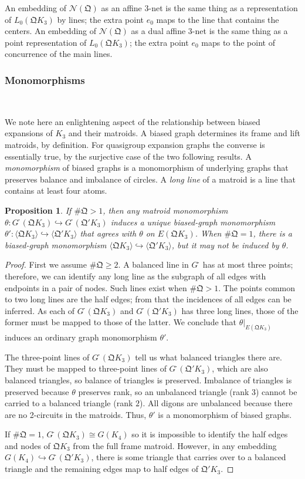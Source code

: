 \documentclass[reqno,12pt]{amsart}
\newtheorem{prop}[thm]{Proposition}
\theoremstyle{remark}
\numberwithin{equation}{section}
\numberwithin{figure}{section}
\newcommand\embeds{\hookrightarrow}
\newcommand \bgr[1]{\langle#1\rangle}
\newcommand \full{^{{}^{{}_{{}_\bullet}}\!}}
\newcommand \cN{\mathcal{N}}
\newcommand \fQ{\mathfrak Q}
\newcommand\G{{G\full}}
\begin{document}
An embedding of $\cN(\fQ)$ as an affine $3$-net is the same thing as a representation of $L_0(\fQ K_3)$ by lines; the extra point $e_0$ maps to the line that contains the centers.
An embedding of $\cN(\fQ)$ as a dual affine $3$-net is the same thing as a point representation of $L_0(\fQ K_3)$; the extra point $e_0$ maps to the point of concurrence of the main lines.

\subsubsection{Monomorphisms}\label{monomorph}\

We note here an enlightening aspect of the relationship between biased expansions of $K_3$ and their matroids.  
A biased graph determines its frame and lift matroids, by definition.  For quasigroup expansion graphs the converse is essentially true, by the surjective case of the two following results.  
A \emph{monomorphism} of biased graphs is a monomorphism of underlying graphs that preserves balance and imbalance of circles.
A \emph{long line} of a matroid is a line that contains at least four atoms.  

\begin{prop}\label{L:frame-graph}
If $\#\fQ > 1$, then any matroid monomorphism $\theta: \G(\fQ K_3) \embeds \G(\fQ' K_3)$ induces a unique biased-graph monomorphism $\theta': \bgr{\fQ K_3} \embeds \bgr{\fQ' K_3}$ that agrees with $\theta$ on $E(\fQ K_3)$.  When $\#\fQ = 1$, there is a biased-graph monomorphism $\bgr{\fQ K_3} \embeds \bgr{\fQ' K_3}$, but it may not be induced by $\theta$.
\end{prop}

\begin{proof}
First we assume $\#\fQ \geq 2$.  A balanced line in $\G$ has at most three points; therefore, we can identify any long line as the subgraph of all edges with endpoints in a pair of nodes.  Such lines exist when $\#\fQ>1$.  The points common to two long lines are the half edges; from that the incidences of all edges can be inferred.  As each of $ \G(\fQ K_3)$ and $\G(\fQ' K_3)$ has three long lines, those of the former must be mapped to those of the latter.  We conclude that $\theta|_{E(\fQ K_3)}$ induces an ordinary graph monomorphism $\theta'$.  

The three-point lines of $\G(\fQ K_3)$ tell us what balanced triangles there are.  They must be mapped to three-point lines of $\G(\fQ' K_3)$, which are also balanced triangles, so balance of triangles is preserved.  Imbalance of triangles is preserved because $\theta$ preserves rank, so an unbalanced triangle (rank $3$) cannot be carried to a balanced triangle (rank $2$).  All digons are unbalanced because there are no 2-circuits in the matroids.  Thus, $\theta'$ is a monomorphism of biased graphs.

If $\#\fQ = 1$, $\G(\fQ K_3) \cong G(K_4)$ so it is impossible to identify the half edges and nodes of $\fQ K_3$ from the full frame matroid.  However, in any embedding $G(K_4) \embeds \G(\fQ' K_3)$, there is some triangle that carries over to a balanced triangle and the remaining edges map to half edges of $\fQ' K_3$.
\end{proof}
\end{document}
